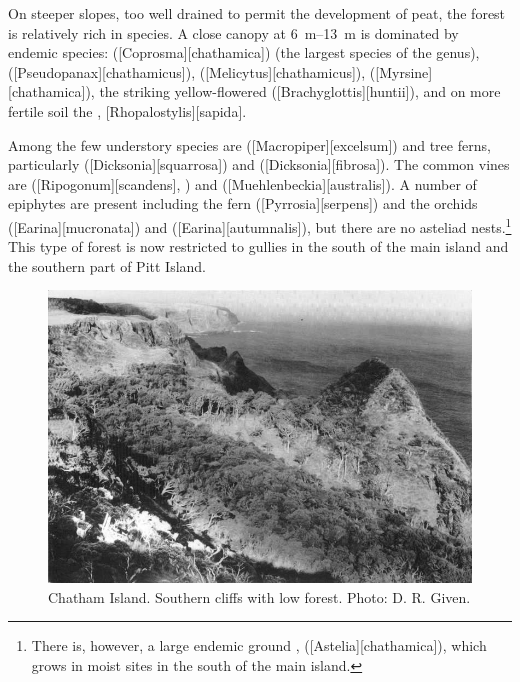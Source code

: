 On steeper slopes, too well drained to permit the development of peat, the forest is relatively rich in species.
A close canopy at \SIrange{6}{13}{\metre} is dominated by endemic species:  ([Coprosma][chathamica]) (the largest species of the genus),  ([Pseudopanax][chathamicus]),  ([Melicytus][chathamicus]),  ([Myrsine][chathamica]), the striking yellow-flowered  ([Brachyglottis][huntii]), and on more fertile soil the , [Rhopalostylis][sapida].

Among the few understory species are  ([Macropiper][excelsum]) and tree ferns, particularly  ([Dicksonia][squarrosa]) and  ([Dicksonia][fibrosa]).
The common vines are  ([Ripogonum][scandens], ) and  ([Muehlenbeckia][australis]).
A number of epiphytes are present including the fern  ([Pyrrosia][serpens]) and the orchids  ([Earina][mucronata]) and  ([Earina][autumnalis]), but there are no asteliad nests.\footnote{There is, however, a large endemic ground ,  ([Astelia][chathamica]), which grows in moist sites in the south of the main island.}
This type of forest is now restricted to gullies in the south of the main island and the southern part of Pitt Island.

\begin{figure}[!b]
	\includegraphics[width=\textwidth]{graphics/fig_118}
	\centering
	\caption[Chatham Island, southern cliffs]{Chatham Island.
	Southern cliffs with low forest.
	Photo: D. R. Given.}%
	\label{fig:118chatham-island}
\end{figure}

